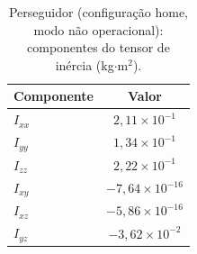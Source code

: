 

\begin{table}[H]
\centering
\caption{Perseguidor (configuração home, modo não operacional): componentes do tensor de inércia (kg$\cdot$m$^2$).}
\label{tab_perseguidor_I_home_SI}
\begin{tabular}{lc}
\hline
\textbf{Componente} & \textbf{Valor} \\
\hline
$I_{xx}$ & $2,11\times 10^{-1}$ \\
$I_{yy}$ & $1,34\times 10^{-1}$ \\
$I_{zz}$ & $2,22\times 10^{-1}$ \\
$I_{xy}$ & $-7,64\times 10^{-16}$ \\
$I_{xz}$ & $-5,86\times 10^{-16}$ \\
$I_{yz}$ & $-3,62\times 10^{-2}$ \\
\hline
\end{tabular}
\end{table}



